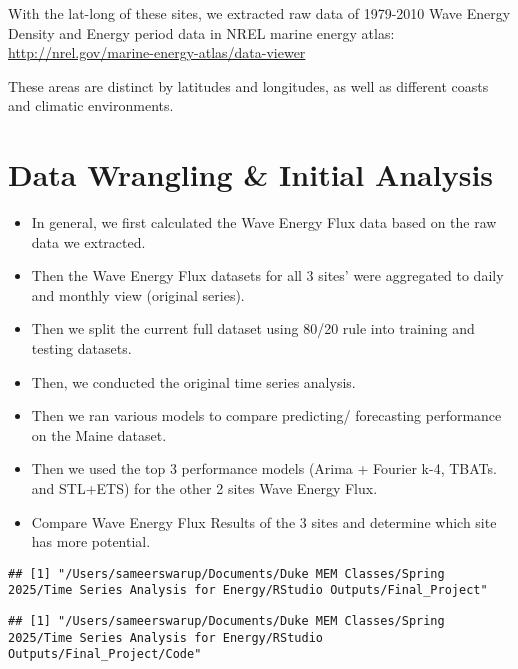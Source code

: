 \documentclass[
]{article}
\providecommand{\tightlist}{%
  \setlength{\itemsep}{0pt}\setlength{\parskip}{0pt}}
\begin{document}
With the lat-long of these sites, we extracted raw data of 1979-2010
Wave Energy Density and Energy period data in NREL marine energy atlas:
\url{http://nrel.gov/marine-energy-atlas/data-viewer}

These areas are distinct by latitudes and longitudes, as well as
different coasts and climatic environments.

\section{Data Wrangling \& Initial
Analysis}\label{data-wrangling-initial-analysis}

\begin{itemize}
\tightlist
\item
  In general, we first calculated the Wave Energy Flux data based on the
  raw data we extracted.\\
\item
  Then the Wave Energy Flux datasets for all 3 sites' were aggregated to
  daily and monthly view (original series).\\
\item
  Then we split the current full dataset using 80/20 rule into training
  and testing datasets.\\
\item
  Then, we conducted the original time series analysis.\\
\item
  Then we ran various models to compare predicting/ forecasting
  performance on the Maine dataset.\\
\item
  Then we used the top 3 performance models (Arima + Fourier k-4, TBATs.
  and STL+ETS) for the other 2 sites Wave Energy Flux.
\item
  Compare Wave Energy Flux Results of the 3 sites and determine which
  site has more potential.
\end{itemize}

\begin{verbatim}
## [1] "/Users/sameerswarup/Documents/Duke MEM Classes/Spring 2025/Time Series Analysis for Energy/RStudio Outputs/Final_Project"
\end{verbatim}

\begin{verbatim}
## [1] "/Users/sameerswarup/Documents/Duke MEM Classes/Spring 2025/Time Series Analysis for Energy/RStudio Outputs/Final_Project/Code"
\end{verbatim}
\end{document}
